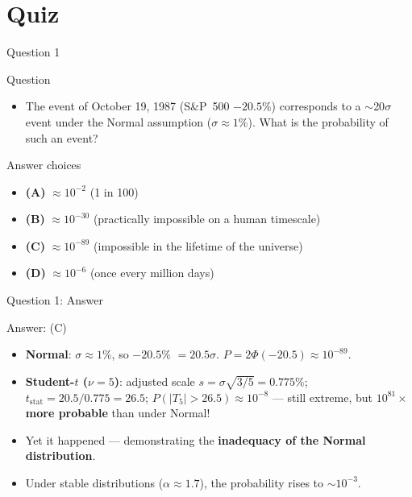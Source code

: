 \documentclass[9pt, aspectratio=169, t]{beamer}
\theoremstyle{definition}
\newenvironment{cminipage}[1]{%
    \par\noindent\hfill\begin{minipage}{#1}\ignorespaces
}{%
    \end{minipage}\hfill\null\par
}
\begin{document}
\section{Quiz}

\begin{frame}{Question 1}
    \begin{cminipage}{0.95\textwidth}
    \begin{alertblock}{Question}
        \begin{itemize}
            \item The event of October 19, 1987 (S\&P~500 $-20.5\%$) corresponds to a $\sim$20$\sigma$ event under the Normal assumption ($\sigma \approx 1\%$). What is the probability of such an event?
        \end{itemize}
    \end{alertblock}

    \vspace{0.3cm}

    \begin{block}{Answer choices}
        \begin{itemize}\setlength{\itemsep}{2pt}
        \item \textcolor{MainBlue}{\textbf{(A)}} $\approx 10^{-2}$ (1 in 100)
        \item \textcolor{MainBlue}{\textbf{(B)}} $\approx 10^{-30}$ (practically impossible on a human timescale)
        \item \textcolor{MainBlue}{\textbf{(C)}} $\approx 10^{-89}$ (impossible in the lifetime of the universe)
        \item \textcolor{MainBlue}{\textbf{(D)}} $\approx 10^{-6}$ (once every million days)
        \end{itemize}
    \end{block}
    \end{cminipage}
\end{frame}

\begin{frame}{Question 1: Answer}
    \begin{cminipage}{0.95\textwidth}
    \begin{exampleblock}{Answer: (C)}
    \begin{itemize}\setlength\itemsep{1pt}
        \item \textbf{Normal}: $\sigma \approx 1\%$, so $-20.5\%$ $= 20.5\sigma$. $P = 2\Phi(-20.5) \approx 10^{-89}$.
        \item \textbf{Student-$t$ ($\nu = 5$)}: adjusted scale $s = \sigma\sqrt{3/5} = 0.775\%$; $t_{\text{stat}} = 20.5/0.775 = 26.5$; $P(|T_5| > 26.5) \approx 10^{-8}$ --- still extreme, but \textbf{$10^{81}\times$ more probable} than under Normal!
        \item Yet it happened --- demonstrating the \textbf{inadequacy of the Normal distribution}.
        \item Under stable distributions ($\alpha \approx 1.7$), the probability rises to $\sim 10^{-3}$.
    \end{itemize}
    \end{exampleblock}
    \end{cminipage}
\end{frame}
\end{document}
